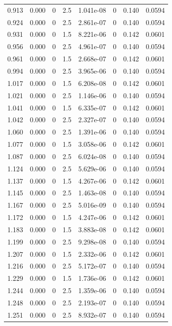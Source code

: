 \documentclass[preview]{standalone}
\begin{document}
{{{\begin{tabular}{L{1.2cm}C{1.2cm} C{0.3cm}C{0.5cm} C{1.4cm}C{1.4cm} C{1.4cm}C{1.4cm}}
  0.913  &  0.000  & 0     & 2.5 &  1.041e-08  & 0  & 0.140 &  0.0594   \\ 
  0.924  &  0.000  & 0     & 2.5 &  2.861e-07  & 0  & 0.140 &  0.0594   \\ 
  0.931  &  0.000  & 0     & 1.5 &  8.221e-06  & 0  & 0.142 &  0.0601   \\ 
  0.956  &  0.000  & 0     & 2.5 &  4.961e-07  & 0  & 0.140 &  0.0594   \\ 
  0.961  &  0.000  & 0     & 1.5 &  2.668e-07  & 0  & 0.142 &  0.0601   \\ 
  0.994  &  0.000  & 0     & 2.5 &  3.965e-06  & 0  & 0.140 &  0.0594   \\ 
  1.017  &  0.000  & 0     & 1.5 &  6.208e-08  & 0  & 0.142 &  0.0601   \\ 
  1.021  &  0.000  & 0     & 2.5 &  1.146e-06  & 0  & 0.140 &  0.0594   \\ 
  1.041  &  0.000  & 0     & 1.5 &  6.335e-07  & 0  & 0.142 &  0.0601   \\ 
  1.042  &  0.000  & 0     & 2.5 &  2.327e-07  & 0  & 0.140 &  0.0594   \\ 
  1.060  &  0.000  & 0     & 2.5 &  1.391e-06  & 0  & 0.140 &  0.0594   \\ 
  1.077  &  0.000  & 0     & 1.5 &  3.058e-06  & 0  & 0.142 &  0.0601   \\ 
  1.087  &  0.000  & 0     & 2.5 &  6.024e-08  & 0  & 0.140 &  0.0594   \\ 
  1.124  &  0.000  & 0     & 2.5 &  5.629e-06  & 0  & 0.140 &  0.0594   \\ 
  1.137  &  0.000  & 0     & 1.5 &  4.267e-06  & 0  & 0.142 &  0.0601   \\ 
  1.145  &  0.000  & 0     & 2.5 &  1.463e-08  & 0  & 0.140 &  0.0594   \\ 
  1.167  &  0.000  & 0     & 2.5 &  5.016e-09  & 0  & 0.140 &  0.0594   \\ 
  1.172  &  0.000  & 0     & 1.5 &  4.247e-06  & 0  & 0.142 &  0.0601   \\ 
  1.183  &  0.000  & 0     & 1.5 &  3.883e-08  & 0  & 0.142 &  0.0601   \\ 
  1.199  &  0.000  & 0     & 2.5 &  9.298e-08  & 0  & 0.140 &  0.0594   \\ 
  1.207  &  0.000  & 0     & 1.5 &  2.332e-06  & 0  & 0.142 &  0.0601   \\ 
  1.216  &  0.000  & 0     & 2.5 &  5.172e-07  & 0  & 0.140 &  0.0594   \\ 
  1.229  &  0.000  & 0     & 1.5 &  1.736e-06  & 0  & 0.142 &  0.0601   \\ 
  1.244  &  0.000  & 0     & 2.5 &  1.359e-06  & 0  & 0.140 &  0.0594   \\ 
  1.248  &  0.000  & 0     & 2.5 &  2.193e-07  & 0  & 0.140 &  0.0594   \\ 
  1.251  &  0.000  & 0     & 2.5 &  8.932e-07  & 0  & 0.140 &  0.0594   \\ 
\hline 
\end{tabular} 

}}}
\end{document}
